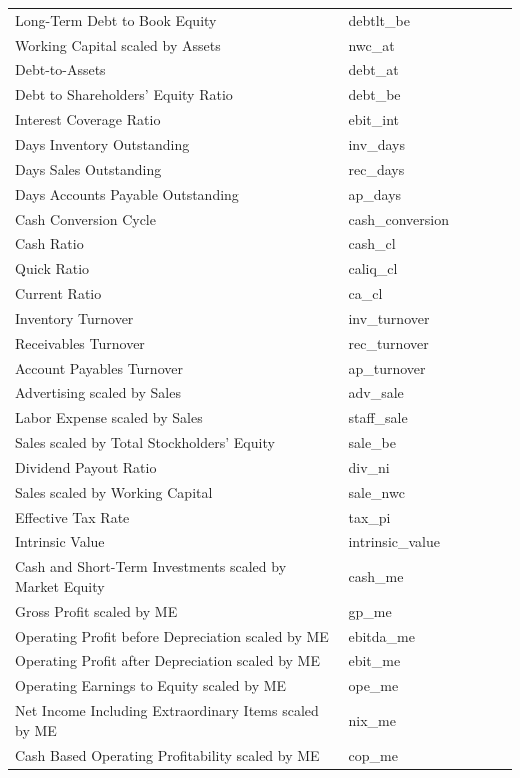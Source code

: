 \documentclass[12pt,title,fleqn]{article}
\begin{document}
\begin{longtable}{p{5cm}p{2cm}p{5cm}lll}
Long-Term Debt to Book Equity & debtlt\_be & & & & \\
Working Capital scaled by Assets & nwc\_at & & & & \\
Debt-to-Assets & debt\_at & & & & \\
Debt to Shareholders' Equity Ratio & debt\_be & & & & \\
Interest Coverage Ratio & ebit\_int & & & & \\
Days Inventory Outstanding & inv\_days & & & & \\
Days Sales Outstanding & rec\_days & & & & \\
Days Accounts Payable Outstanding & ap\_days & & & & \\
Cash Conversion Cycle & cash\_conversion & & & & \\
Cash Ratio & cash\_cl & & & & \\
Quick Ratio & caliq\_cl & & & & \\
Current Ratio & ca\_cl & & & & \\
Inventory Turnover & inv\_turnover & & & & \\
Receivables Turnover & rec\_turnover & & & & \\
Account Payables Turnover & ap\_turnover & & & & \\
Advertising scaled by Sales & adv\_sale & & & & \\
Labor Expense scaled by Sales & staff\_sale & & & & \\
Sales scaled by Total Stockholders' Equity & sale\_be & & & & \\
Dividend Payout Ratio & div\_ni & & & & \\
Sales scaled by Working Capital & sale\_nwc & & & & \\
Effective Tax Rate & tax\_pi & & & & \\
Intrinsic Value & intrinsic\_value & & & & \\
Cash and Short-Term Investments scaled by Market Equity & cash\_me & & & & \\
Gross Profit scaled by ME & gp\_me & & & & \\
Operating Profit before Depreciation scaled by ME & ebitda\_me & & & & \\
Operating Profit after Depreciation scaled by ME & ebit\_me & & & & \\
Operating Earnings to Equity scaled by ME & ope\_me & & & & \\
Net Income Including Extraordinary Items scaled by ME & nix\_me & & & & \\
Cash Based Operating Profitability scaled by ME & cop\_me & & & & \\

\end{longtable}
\end{document}

